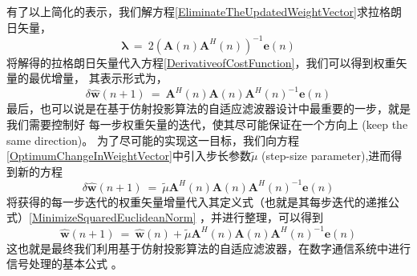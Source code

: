 有了以上简化的表示，我们解方程\eqref{EliminateTheUpdatedWeightVector}求拉格朗日矢量，
\begin{equation}%
    \boldsymbol{\lambda} ~=~ 2(\mathbf{A}(n)\mathbf{A}^{H}(n))^{-1}\mathbf{e}(n)
\end{equation}
将解得的拉格朗日矢量代入方程\eqref{DerivativeofCostFunction}，我们可以得到权重矢量的最优增量，
其表示形式为，
\begin{equation}\label{OptimumChangeInWeightVector}
    \delta\hat{\mathbf{w}}(n+1) ~=~ \mathbf{A}^{H}(n)\mathbf{A}(n)\mathbf{A}^{H}(n)^{-1}\mathbf{e}(n)
\end{equation}
最后，也可以说是在基于仿射投影算法的自适应滤波器设计中最重要的一步，就是我们需要控制好
每一步权重矢量的迭代，使其尽可能保证在一个方向上 (keep the same direction)。
为了尽可能的实现这一目标，我们向方程\eqref{OptimumChangeInWeightVector}中引入步长参数$\tilde{\mu}$
(step-size parameter),进而得到新的方程
\begin{equation}%
    \delta\hat{\mathbf{w}}(n+1) ~=~ \tilde{\mu}\mathbf{A}^{H}(n)\mathbf{A}(n)\mathbf{A}^{H}(n)^{-1}\mathbf{e}(n)
\end{equation}
将获得的每一步迭代的权重矢量增量代入其定义式（也就是其每步迭代的递推公式）\eqref{MinimizeSquaredEuclideanNorm}
，并进行整理，可以得到
\begin{equation}\label{DesiredUpdateEquationForAPAFilter}
    \hat{\mathbf{w}}(n+1) ~=~
    \hat{\mathbf{w}}(n) +
    \tilde{\mu}\mathbf{A}^{H}(n)\mathbf{A}(n)\mathbf{A}^{H}(n)^{-1}\mathbf{e}(n)
\end{equation}
这也就是最终我们利用基于仿射投影算法的自适应滤波器，在数字通信系统中进行信号处理的基本公式
。


